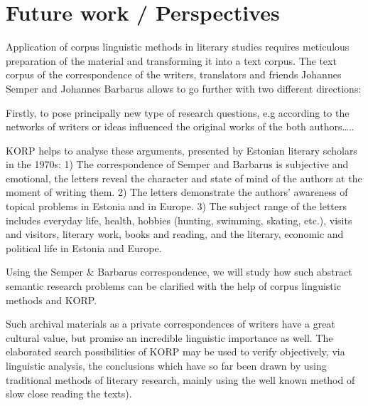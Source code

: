 \documentclass[runningheads]{llncs}
\begin{document}
\section{Future work / Perspectives}

Application of corpus linguistic methods in literary studies requires meticulous preparation of the material and transforming it into a text corpus. The text corpus of the correspondence of the writers, translators and friends Johannes Semper and Johannes Barbarus allows to go further with two different directions:

Firstly, to pose principally new type of research  questions, e.g according to the networks of  writers or ideas influenced  the original works of the both authors…..


KORP helps to analyse these arguments, presented by Estonian literary scholars in the 1970s:
1) The correspondence of Semper and Barbarus is subjective and emotional, the letters reveal the character and state of mind of the authors at the moment of writing them.
2) The letters demonstrate the authors’ awareness of topical problems in Estonia and in Europe.
3) The subject range of the letters includes everyday life, health, hobbies (hunting, swimming, skating, etc.), visits and visitors, literary work, books and reading, and the literary, economic and political life in Estonia and Europe.


Using the Semper \& Barbarus correspondence, we will study how such abstract semantic research problems can be clarified with the help of corpus linguistic methods and KORP.

Such archival materials as a private correspondences of writers have a great cultural value, but promise an incredible linguistic importance as well. The elaborated search possibilities of KORP may be used to verify objectively, via linguistic analysis, the conclusions which have so far been drawn by using traditional methods of literary research, mainly using the well known method of slow close reading the texts). 



%
%
%


%
\end{document}

